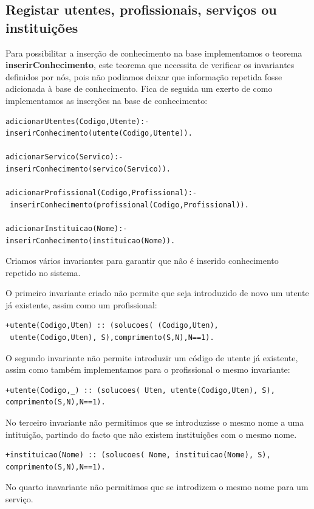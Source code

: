 \subsection{Registar utentes, profissionais, serviços ou instituições}
Para possibilitar a inserção de conhecimento na base implementamos o teorema \textbf{inserirConhecimento}, este teorema que necessita de verificar os invariantes definidos por nós, pois não podiamos deixar que informação repetida fosse adicionada à base de conhecimento. Fica de seguida um exerto de como implementamos as inserções na base de conhecimento: 

\begin{Verbatim}
adicionarUtentes(Codigo,Utente):- 
inserirConhecimento(utente(Codigo,Utente)).

adicionarServico(Servico):- 
inserirConhecimento(servico(Servico)).

adicionarProfissional(Codigo,Profissional):-
 inserirConhecimento(profissional(Codigo,Profissional)).

adicionarInstituicao(Nome):- 
inserirConhecimento(instituicao(Nome)).
\end{Verbatim}

Criamos vários invariantes para garantir que não é inserido conhecimento repetido no sistema. 

O primeiro invariante criado não permite que seja introduzido de novo um utente já existente, assim como um profissional: 

\begin{Verbatim}
+utente(Codigo,Uten) :: (solucoes( (Codigo,Uten),
 utente(Codigo,Uten), S),comprimento(S,N),N==1).
\end{Verbatim}

O segundo invariante não permite introduzir um código de utente já existente, assim como também implementamos para o profissional o mesmo invariante: 
\begin{Verbatim}
+utente(Codigo,_) :: (solucoes( Uten, utente(Codigo,Uten), S),
comprimento(S,N),N==1).
\end{Verbatim}

No terceiro invariante não permitimos que se introduzisse o mesmo nome a uma intituição, partindo do facto que não existem instituições com o mesmo nome. 

\begin{Verbatim}
+instituicao(Nome) :: (solucoes( Nome, instituicao(Nome), S),
comprimento(S,N),N==1). 
\end{Verbatim}
No quarto inavariante não permitimos que se introdizem o mesmo nome para um serviço. 

